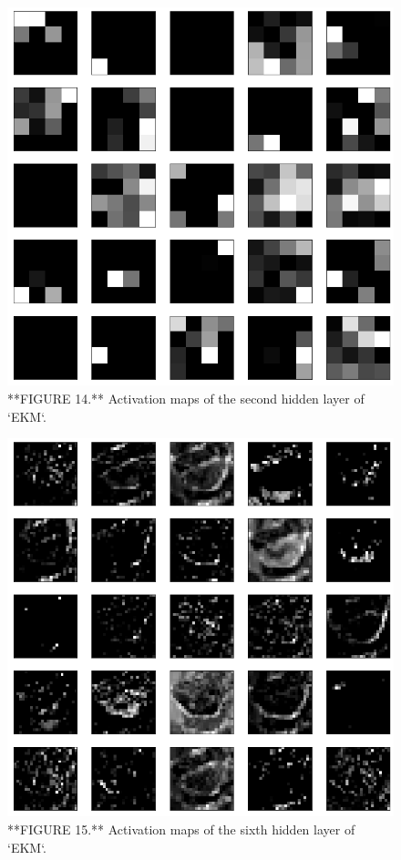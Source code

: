 \documentclass{acm_proc_article-sp}
\begin{document}
\begin{figure}

{\centering \includegraphics[width=9.5in]{Images/FeatureMaps2} 

}

\caption{**FIGURE 14.** Activation maps of the second hidden layer of `EKM`.}\label{fig:maps2}
\end{figure}
\begin{figure}

{\centering \includegraphics[width=9.5in]{Images/FeatureMaps6} 

}

\caption{**FIGURE 15.** Activation maps of the sixth hidden layer of `EKM`.}\label{fig:maps6}
\end{figure}
\end{document}
